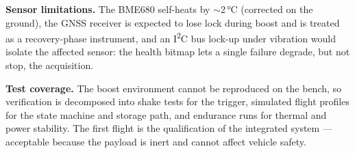 \textbf{Sensor limitations.} The BME680 self-heats by $\sim$2\,°C (corrected
on the ground), the GNSS receiver is expected to lose lock during boost and
is treated as a recovery-phase instrument, and an I\textsuperscript{2}C bus
lock-up under vibration would isolate the affected sensor: the health bitmap
lets a single failure degrade, but not stop, the acquisition.

\textbf{Test coverage.} The boost environment cannot be reproduced on the
bench, so verification is decomposed into shake tests for the trigger,
simulated flight profiles for the state machine and storage path, and
endurance runs for thermal and power stability. The first flight is the
qualification of the integrated system — acceptable because the payload is
inert and cannot affect vehicle safety.
